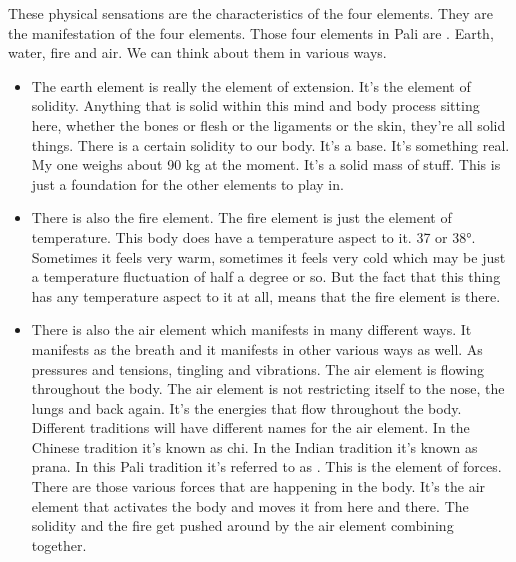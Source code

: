 \documentclass[letterpaper,10pt,english]{sphinxmanual}
\begin{document}
\sphinxAtStartPar
These physical sensations are the characteristics of the four elements.
They are the manifestation of the four elements. Those four elements in Pali
are
.
Earth,  water,  fire  and  air.  We  can  think
about them in various ways.
\begin{itemize}
\item {} 
\sphinxAtStartPar
The earth element is really the element of extension. It’s the element
of solidity. Anything that is solid within this mind and body process
sitting  here,  whether  the  bones  or  flesh  or  the  ligaments  or  the  skin,
they’re  all  solid  things. There  is  a  certain  solidity  to  our  body.  It’s  a
base. It’s something real. My one weighs about 90 kg at the moment.
It’s a solid mass of stuff. This is just a foundation for the other elements
to play in.

\item {} 
\sphinxAtStartPar
There is also the fire element. The fire element is just the element of
temperature. This body does have a temperature aspect to it. 37 or 38°.
Sometimes it feels very warm, sometimes it feels very cold which may
be just a temperature fluctuation of half a degree or so. But the fact that
this  thing  has  any  temperature  aspect  to  it  at  all,  means  that  the  fire
element is there.

\item {} 
\sphinxAtStartPar
There is also the air element which manifests in many different ways.
It  manifests  as  the  breath  and  it  manifests  in  other  various  ways  as
well. As  pressures  and  tensions,  tingling  and  vibrations. The  air  element is flowing throughout the body. The air element is not restricting
itself to the nose, the lungs and back again. It’s the energies that flow
throughout the body. Different traditions will have different names for
the air element. In the Chinese tradition it’s known as chi. In the Indian
tradition  it’s  known  as  prana.  In  this  Pali  tradition  it’s  referred  to  as
. This is the element of forces. There are those various forces that
are happening in the body. It’s the air element that activates the body
and moves it from here and there. The solidity and the fire get pushed
around by the air element combining together.


\end{itemize}
\end{document}
